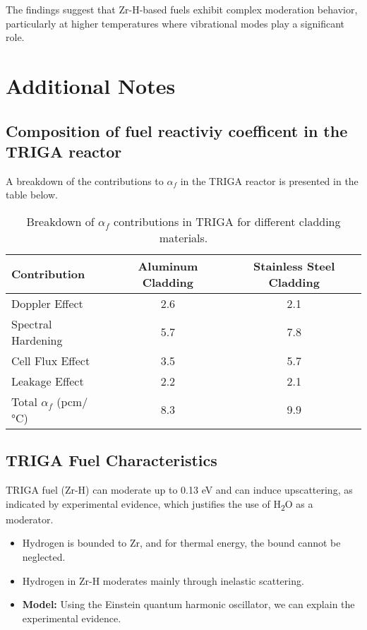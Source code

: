 \begin{tcolorbox}[boxstyle2]
The findings suggest that Zr-H-based fuels exhibit complex moderation behavior, particularly at higher temperatures where vibrational modes play a significant role.
\end{tcolorbox}

\section{Additional Notes}

\subsection{Composition of fuel reactiviy coefficent in the TRIGA reactor}

A breakdown of the contributions to $\alpha_f$ in the TRIGA reactor is presented in the table below.

\begin{table}[h]
    \centering
    \begin{tabular}{|l|c|c|}
        \hline
        Contribution & Aluminum Cladding & Stainless Steel Cladding \\
        \hline
        Doppler Effect & 2.6 & 2.1 \\
        Spectral Hardening & 5.7 & 7.8 \\
        Cell Flux Effect & 3.5 & 5.7 \\
        Leakage Effect & 2.2 & 2.1 \\
        \hline
        Total $\alpha_f$ (pcm/°C) & 8.3 & 9.9 \\
        \hline
    \end{tabular}
    \caption{Breakdown of $\alpha_f$ contributions in TRIGA for different cladding materials.}
\end{table}

\subsection{TRIGA Fuel Characteristics}
TRIGA fuel (Zr-H) can moderate up to 0.13 eV and can induce upscattering, as indicated by experimental evidence, which justifies the use of H\textsubscript{2}O as a moderator.

\begin{itemize}
    \item Hydrogen is bounded to Zr, and for thermal energy, the bound cannot be neglected.
    \item Hydrogen in Zr-H moderates mainly through inelastic scattering.
    \item \textbf{Model:} Using the Einstein quantum harmonic oscillator, we can explain the experimental evidence.
\end{itemize}

